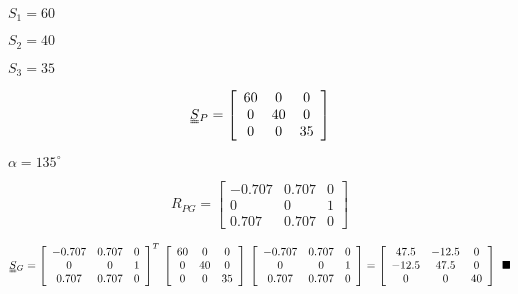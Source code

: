 \documentclass[onecolumn,11pt]{report}
\def\lthtmlcheckvsize{\ifdim\ht\sizebox<\vsize 
  \ifdim\wd\sizebox<\hsize\expandafter\hfill\fi \expandafter\vfill
  \else\expandafter\vss\fi}%
\begin{document}
{\newpage\clearpage
{}%
$ S_1 = 60$%
\lthtmlindisplaymathZ
\lthtmlcheckvsize\clearpage}

{\newpage\clearpage
{}%
$ S_2 = 40$%
\lthtmlindisplaymathZ
\lthtmlcheckvsize\clearpage}

{\newpage\clearpage
{}%
$ S_3 = 35$%
\lthtmlindisplaymathZ
\lthtmlcheckvsize\clearpage}

{\newpage\clearpage
{}%
\begin{displaymath}\uuline{S}{}_P
=
\left[
\begin{array}{ccc}
60 & 0  & 0 \\
0  & 40 & 0 \\
0  &  0 & 35
\end{array}
\right]\end{displaymath}%
\lthtmldisplayZ
\lthtmlcheckvsize\clearpage}

{\newpage\clearpage
{}%
$ \alpha = 135^{\circ}$%
\lthtmlindisplaymathZ
\lthtmlcheckvsize\clearpage}

{\newpage\clearpage
{}%
\begin{displaymath}R_{PG}
=
\left[
\begin{array}{ccc}
-0.707  & 0.707  & 0 \\
0  & 0  & 1 \\
0.707  & 0.707 & 0
\end{array}
\right]\end{displaymath}%
\lthtmldisplayZ
\lthtmlcheckvsize\clearpage}

{\newpage\clearpage
{}%
\begin{displaymath}\uuline{S}{}_G
=
\left[
\begin{array}{ccc}
-0.707  & 0.707  & 0 \\
0  & 0  & 1 \\
0.707  & 0.707 & 0
\end{array}
\right]^T
\:
\left[
\begin{array}{ccc}
60 & 0  & 0 \\
0  & 40 & 0 \\
0  &  0 & 35
\end{array}
\right]
\:
\left[
\begin{array}{ccc}
-0.707  & 0.707  & 0 \\
0  & 0  & 1 \\
0.707  & 0.707 & 0
\end{array}
\right]
=
\left[
\begin{array}{ccc}
47.5  & -12.5  & 0 \\
-12.5  &  47.5  & 0 \\
0    &  0     & 40
\end{array}
\right]
\: \: \blacksquare\end{displaymath}%
\lthtmldisplayZ
\lthtmlcheckvsize\clearpage}
\end{document}
